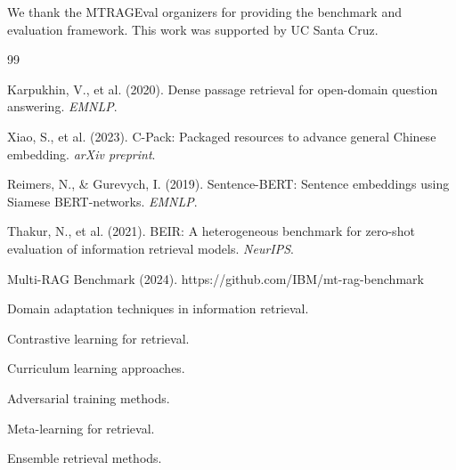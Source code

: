 \documentclass[11pt]{article}
\begin{document}
We thank the MTRAGEval organizers for providing the benchmark and evaluation framework. This work was supported by UC Santa Cruz.


\begin{thebibliography}{99}

Karpukhin, V., et al. (2020). Dense passage retrieval for open-domain question answering. \textit{EMNLP}.

Xiao, S., et al. (2023). C-Pack: Packaged resources to advance general Chinese embedding. \textit{arXiv preprint}.

Reimers, N., \& Gurevych, I. (2019). Sentence-BERT: Sentence embeddings using Siamese BERT-networks. \textit{EMNLP}.

Thakur, N., et al. (2021). BEIR: A heterogeneous benchmark for zero-shot evaluation of information retrieval models. \textit{NeurIPS}.

Multi-RAG Benchmark (2024). https://github.com/IBM/mt-rag-benchmark

Domain adaptation techniques in information retrieval.

Contrastive learning for retrieval.

Curriculum learning approaches.

Adversarial training methods.

Meta-learning for retrieval.

Ensemble retrieval methods.

\end{thebibliography}
\end{document}
